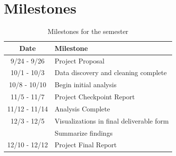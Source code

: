 \documentclass[sigconf, hyperref={colorlinks=true,linkcolor=blue,urlcolor=blue}]{acmart}
\begin{document}
\section{Milestones}
\begin{table}[H]
  \caption{Milestones for the semester}
  \label{tab:freq}
  \begin{tabular}{c|l}
    \toprule
    Date & Milestone \\
    \midrule
    9/24 - 9/26   & Project Proposal \\
    10/1 - 10/3   & Data discovery and cleaning complete \\
    10/8 - 10/10  & Begin initial analysis \\
    11/5 - 11/7   & Project Checkpoint Report \\
    11/12 - 11/14 & Analysis Complete \\
    12/3 - 12/5   & Visualizations in final deliverable form \\
                  & Summarize findings \\
    12/10 - 12/12 & Project Final Report \\
    \bottomrule
  \end{tabular}
\end{table}
\end{document}
